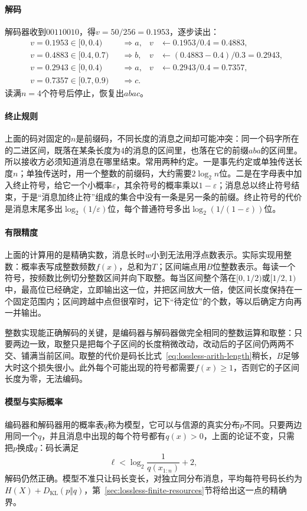 \paragraph{解码}
解码器收到$00110010$，得$v=50/256=0.1953$，逐步读出：
\[
 \begin{aligned}
 &v=0.1953\in[0,0.4) &&\Rightarrow a, & v&\leftarrow0.1953/0.4=0.4883,\\
 &v=0.4883\in[0.4,0.7) &&\Rightarrow b, & v&\leftarrow(0.4883-0.4)/0.3=0.2943,\\
 &v=0.2943\in[0,0.4) &&\Rightarrow a, & v&\leftarrow0.2943/0.4=0.7357,\\
 &v=0.7357\in[0.7,0.9) &&\Rightarrow c .
 \end{aligned}
\]
读满$n=4$个符号后停止，恢复出$abac$。

\paragraph{终止规则}
上面的码对固定的$n$是前缀码，不同长度的消息之间却可能冲突：同一个码字所在的二进区间，既落在某条长度为$4$的消息的区间里，也落在它的前缀$aba$的区间里。所以接收方必须知道消息在哪里结束。常用两种约定。一是事先约定或单独传送长度$n$；单独传送时，用一个整数的前缀码，大约需要$2\log_2n$位。二是在字母表中加入终止符号，给它一个小概率$\varepsilon$，其余符号的概率乘以$1-\varepsilon$；消息总以终止符号结束，于是“消息加终止符”组成的集合中没有一条是另一条的前缀。终止符号的代价是消息末尾多出$\log_2(1/\varepsilon)$位，每个普通符号多出$\log_2(1/(1-\varepsilon))$位。

\paragraph{有限精度}
上面的计算用的是精确实数，消息长时$w$小到无法用浮点数表示。实际实现用整数：概率表写成整数频数$f(x)$，总和为$T$；区间端点用$B$位整数表示。每读一个符号，按频数比例切分整数区间并向下取整。每当区间整个落在$[0,1/2)$或$[1/2,1)$中，最高位已经确定，立即输出这一位，并把区间放大一倍，使区间长度保持在一个固定范围内；区间跨越中点但很窄时，记下“待定位”的个数，等以后确定方向再一并输出。

整数实现能正确解码的关键，是编码器与解码器做完全相同的整数运算和取整：只要两边一致，取整只是把每个子区间的长度稍微改动，改动后的子区间仍两两不交、铺满当前区间。取整的代价是码长比式~\eqref{eq:lossless-arith-length}稍长，$B$足够大时这个损失很小。此外每个可能出现的符号都需要$f(x)\geq1$，否则它的子区间长度为零，无法编码。

\paragraph{模型与实际概率}
编码器和解码器用的概率表$q$称为模型，它可以与信源的真实分布$p$不同。只要两边用同一个$q$，并且消息中出现的每个符号都有$q(x)>0$，上面的论证不变，只需把$p$换成$q$：码长满足
\[
 \ell<\log_2\frac{1}{q(x_{1:n})}+2 ,
\]
解码仍然正确。模型不准只让码长变长，对独立同分布消息，平均每符号码长约为$H(X)+D_{\mathrm{KL}}(p\Vert q)$，第~\ref{sec:lossless-finite-resources}节将给出这一点的精确界。

